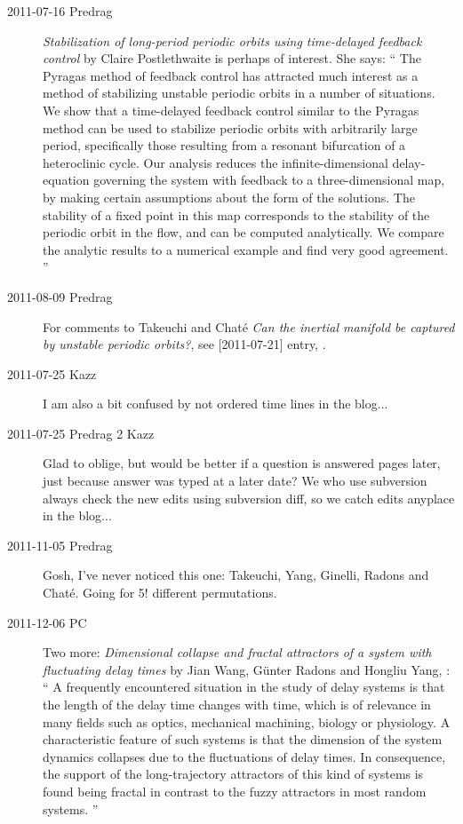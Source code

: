 \begin{description}
\item[2011-07-16 Predrag]
{\em Stabilization of long-period periodic orbits
    using time-delayed feedback control} by Claire
    Postlethwaite
is perhaps of interest. She says: ``
The Pyragas method of feedback control has attracted much interest as a
method of stabilizing unstable periodic orbits in a number of situations.
We show that a time-delayed feedback control similar to the Pyragas
method can be used to stabilize periodic orbits with arbitrarily large
period, specifically those resulting from a resonant bifurcation of a
heteroclinic cycle. Our analysis reduces the infinite-dimensional
delay-equation governing the system with feedback to a three-dimensional
map, by making certain assumptions about the form of the solutions. The
stability of a fixed point in this map corresponds to the stability of
the periodic orbit in the flow, and can be computed analytically. We
compare the analytic results to a numerical example and find very good
agreement.
''

\item[2011-08-09 Predrag] For comments to Takeuchi and Chat\'e
\emph{Can the inertial manifold be captured by unstable periodic
orbits?}, see [2011-07-21] entry, .

\item[2011-07-25 Kazz]
I am also a bit confused by not ordered time lines in the blog...

\item[2011-07-25 Predrag 2 Kazz]
Glad to oblige, but would be better if a question is answered pages
later, just because answer was typed at a later date? We who use subversion
always check the new edits using subversion diff, so we catch
edits anyplace in the blog...

\item[2011-11-05 Predrag] Gosh, I've never noticed this one:
Takeuchi, Yang, Ginelli, Radons and Chat\'{e}.
Going for 5! different permutations.

\item[2011-12-06 PC] Two more:
\emph{Dimensional collapse and fractal attractors of a system with fluctuating
 delay times}
by Jian Wang, G\"unter Radons and Hongliu Yang,
:
``
 A frequently encountered situation in the study of delay systems is that the
length of the delay time changes with time, which is of relevance in many
fields such as optics, mechanical machining, biology or physiology. A
characteristic feature of such systems is that the dimension of the system
dynamics collapses due to the fluctuations of delay times. In consequence, the
support of the long-trajectory attractors of this kind of systems is found
being fractal in contrast to the fuzzy attractors in most random systems.
''


\end{description}
